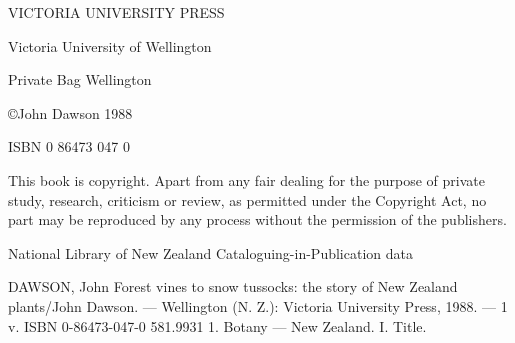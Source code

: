 \thispagestyle{empty}

VICTORIA UNIVERSITY PRESS

Victoria University of Wellington

Private Bag Wellington

©John Dawson 1988

ISBN 0 86473 047 0


This book is copyright. Apart from any fair dealing for the purpose of private study, research, criticism or review, as permitted under the Copyright Act, no part may be reproduced by any process without the permission of the publishers.

National Library of New Zealand
Cataloguing-in-Publication data

DAWSON, John
Forest vines to snow tussocks: the story of New Zealand plants/John Dawson. --- Wellington
(N. Z.): Victoria University Press, 1988. --- 1 v.
ISBN 0-86473-047-0
581.9931
1. Botany --- New Zealand. I. Title.
